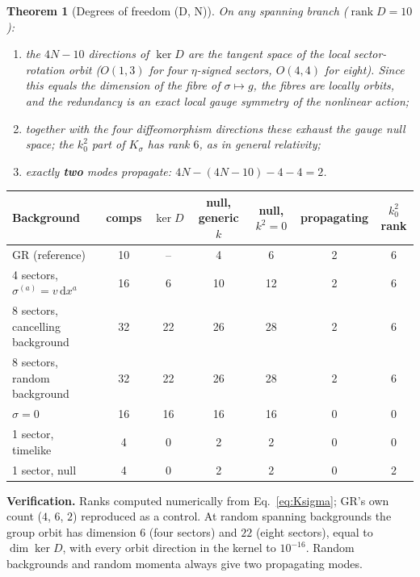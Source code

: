 \documentclass[11pt,a4paper]{article}
\newtheorem{theorem}{Theorem}[section]
\begin{document}
\begin{theorem}[Degrees of freedom (D, N)]\label{thm:dof}
On any spanning branch ($\operatorname{rank}D=10$):
\begin{enumerate}
\item the $4N-10$ directions of $\ker D$ are the tangent space of the local sector-rotation
orbit ($O(1,3)$ for four $\eta$-signed sectors, $O(4,4)$ for eight). Since this equals the
dimension of the fibre of $\sigma\mapsto g$, the fibres are locally orbits, and the
redundancy is an exact local gauge symmetry of the nonlinear action;
\item together with the four diffeomorphism directions these exhaust the gauge null
space; the $k_0^2$ part of $K_\sigma$ has rank $6$, as in general relativity;
\item exactly \textbf{two} modes propagate: $4N-(4N-10)-4-4=2$.
\end{enumerate}
\end{theorem}
\begin{center}\small
\begin{tabular}{@{}lcccccc@{}}\toprule
Background & comps & $\ker D$ & null, generic $k$ & null, $k^2=0$ & propagating & $k_0^2$ rank\\\midrule
GR (reference) & 10 & -- & 4 & 6 & 2 & 6\\
4 sectors, $\sigma^{(a)}=v\,\mathrm dx^a$ & 16 & 6 & 10 & 12 & 2 & 6\\
8 sectors, cancelling background & 32 & 22 & 26 & 28 & 2 & 6\\
8 sectors, random background & 32 & 22 & 26 & 28 & 2 & 6\\
$\sigma=0$ & 16 & 16 & 16 & 16 & 0 & 0\\
1 sector, timelike & 4 & 0 & 2 & 2 & 0 & 0\\
1 sector, null & 4 & 0 & 2 & 2 & 0 & 2\\\bottomrule
\end{tabular}
\end{center}
\noindent\textbf{Verification.} Ranks computed numerically from Eq.~\eqref{eq:Ksigma}; GR's
own count ($4$, $6$, $2$) reproduced as a control. At random spanning backgrounds the
group orbit has dimension $6$ (four sectors) and $22$ (eight sectors), equal to $\dim\ker D$,
with every orbit direction in the kernel to $10^{-16}$. Random backgrounds and random momenta
always give two propagating modes.
\end{document}
